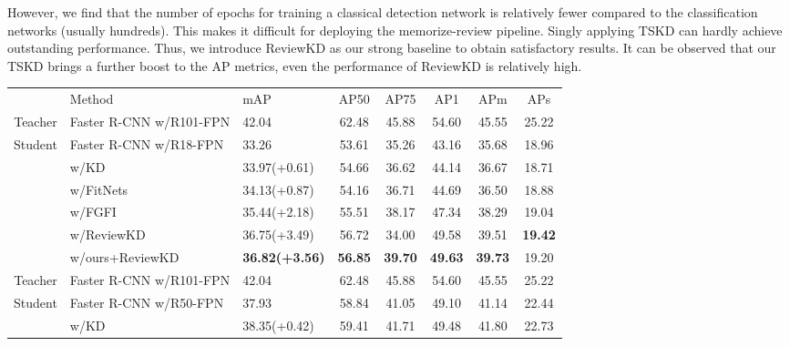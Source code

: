 \documentclass[letterpaper]{article} %
\begin{document}
However, we find that the number of epochs for training a classical detection network is relatively fewer compared to the classification networks (usually hundreds). This makes it difficult for deploying the memorize-review pipeline. Singly applying TSKD can hardly achieve outstanding performance. Thus, we introduce ReviewKD \cite{chen2021distilling} as our strong baseline to obtain satisfactory results. It can be observed that our TSKD brings a further boost to the AP metrics, even the performance of ReviewKD is relatively high. 
\begin{table}[!h]
\centering
\begin{tabular}{@{}cl|lccccc@{}}
        & Method                  & mAP            & AP50           & AP75           & AP1            & APm            & APs            \\ \Xhline{1.5pt}
Teacher & Faster R-CNN w/R101-FPN & 42.04          & 62.48          & 45.88          & 54.60          & 45.55          & 25.22          \\
Student & Faster R-CNN w/R18-FPN  & 33.26          & 53.61          & 35.26          & 43.16          & 35.68          & 18.96          \\
        & w/KD                    & 33.97(+0.61)          & 54.66          & 36.62          & 44.14          & 36.67          & 18.71          \\
        & w/FitNets               & 34.13(+0.87)          & 54.16          & 36.71          & 44.69          & 36.50          & 18.88          \\
        & w/FGFI                  & 35.44(+2.18)          & 55.51          & 38.17          & 47.34          & 38.29          & 19.04          \\
        & w/ReviewKD             & 36.75(+3.49)          & 56.72          & 34.00          & 49.58          & 39.51          & \textbf{19.42} \\
        & w/ours+ReviewKD                 & \textbf{36.82(+3.56)} & \textbf{56.85} & \textbf{39.70} & \textbf{49.63} & \textbf{39.73} & 19.20          \\ \hline
Teacher & Faster R-CNN w/R101-FPN & 42.04          & 62.48          & 45.88          & 54.60          & 45.55          & 25.22          \\
Student & Faster R-CNN w/R50-FPN  & 37.93          & 58.84          & 41.05          & 49.10          & 41.14          & 22.44          \\
        & w/KD                    & 38.35(+0.42)          & 59.41          & 41.71          & 49.48          & 41.80          & 22.73          \\

\end{tabular}
\end{table}
\end{document}
